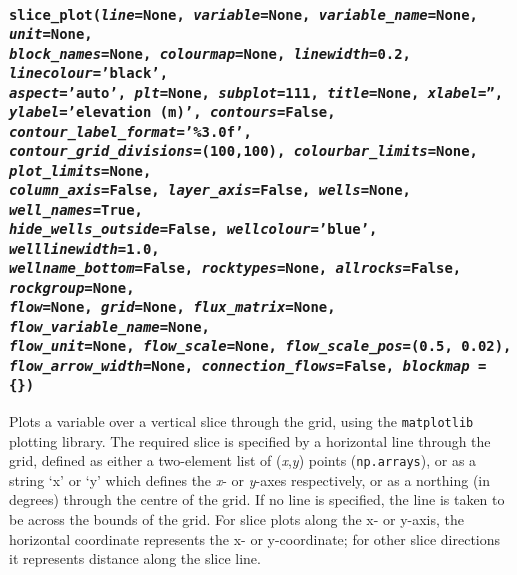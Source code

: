 \begin{snugshade}
\subsubsection{\texttt{slice\_plot(\emph{line}=None, \emph{variable}=None, \emph{variable\_name}=None, \emph{unit}=None,\\
    \emph{block\_names}=None, \emph{colourmap}=None, \emph{linewidth}=0.2, \emph{linecolour}='black',\\
    \emph{aspect}='auto', \emph{plt}=None, \emph{subplot}=111, \emph{title}=None, \emph{xlabel}='',\\
    \emph{ylabel}='elevation (m)', \emph{contours}=False, \emph{contour\_label\_format}='\%3.0f',\\
    \emph{contour\_grid\_divisions}=(100,100), \emph{colourbar\_limits}=None, \emph{plot\_limits}=None,\\
    \emph{column\_axis}=False, \emph{layer\_axis}=False, \emph{wells}=None, \emph{well\_names}=True,\\
    \emph{hide\_wells\_outside}=False, \emph{wellcolour}='blue', \emph{welllinewidth}=1.0,\\
    \emph{wellname\_bottom}=False, \emph{rocktypes}=None, \emph{allrocks}=False, \emph{rockgroup}=None,\\
    \emph{flow}=None, \emph{grid}=None, \emph{flux\_matrix}=None, \emph{flow\_variable\_name}=None,\\
    \emph{flow\_unit}=None, \emph{flow\_scale}=None, \emph{flow\_scale\_pos}=(0.5, 0.02),\\
    \emph{flow\_arrow\_width}=None, \emph{connection\_flows}=False, \emph{blockmap} = \{\})}}
\end{snugshade}
\label{sec:mulgrid:slice_plot}

Plots a variable over a vertical slice through the grid, using the \texttt{matplotlib} plotting library.  The required slice is specified by a horizontal line through the grid, defined as either a two-element list of (\emph{x},\emph{y}) points (\texttt{np.arrays}), or as a string `x' or `y' which defines the \emph{x}- or \emph{y}-axes respectively, or as a northing (in degrees) through the centre of the grid.  If no line is specified, the line is taken to be across the bounds of the grid.  For slice plots along the x- or y-axis, the horizontal coordinate represents the x- or y-coordinate; for other slice directions it represents distance along the slice line.


